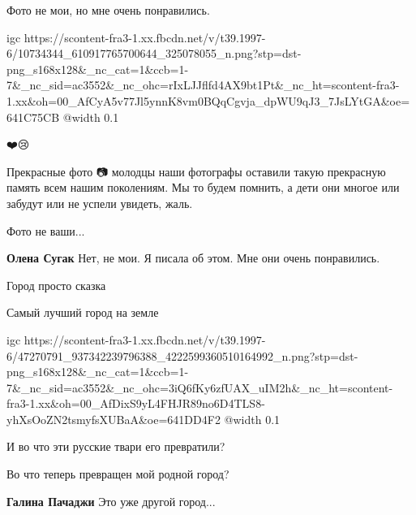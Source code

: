  
 
 
 
 

\qqSecCmt


Фото не мои, но мне очень понравились.


\ifcmt
  igc https://scontent-fra3-1.xx.fbcdn.net/v/t39.1997-6/10734344_610917765700644_325078055_n.png?stp=dst-png_s168x128&_nc_cat=1&ccb=1-7&_nc_sid=ac3552&_nc_ohc=rIxLJJflfd4AX9bt1Pt&_nc_ht=scontent-fra3-1.xx&oh=00_AfCyA5v77Jl5ynnK8vm0BQqCgvja_dpWU9qJ3_7JsLYtGA&oe=641C75CB
	@width 0.1
\fi


❤️😢


Прекрасные фото 📷 молодцы наши фотографы оставили такую прекрасную память всем
нашим поколениям. Мы то будем помнить, а дети они многое или забудут или не
успели увидеть, жаль.


Фото не ваши...

\begin{itemize} %
\textbf{Олена Сугак} Нет, не мои. Я писала об этом. Мне они очень понравились.
\end{itemize} %


Город просто сказка🥰


Самый лучший город на земле

\ifcmt
  igc https://scontent-fra3-1.xx.fbcdn.net/v/t39.1997-6/47270791_937342239796388_4222599360510164992_n.png?stp=dst-png_s168x128&_nc_cat=1&ccb=1-7&_nc_sid=ac3552&_nc_ohc=3iQ6fKy6zfUAX_uIM2h&_nc_ht=scontent-fra3-1.xx&oh=00_AfDixS9yL4FHJR89no6D4TLS8-yhXsOoZN2tsmyfsXUBaA&oe=641DD4F2
	@width 0.1
\fi


И во что эти русские твари его превратили?


Во что теперь превращен мой родной город?

\begin{itemize} %
\textbf{Галина Пачаджи} Это уже другой город...
\end{itemize} %
